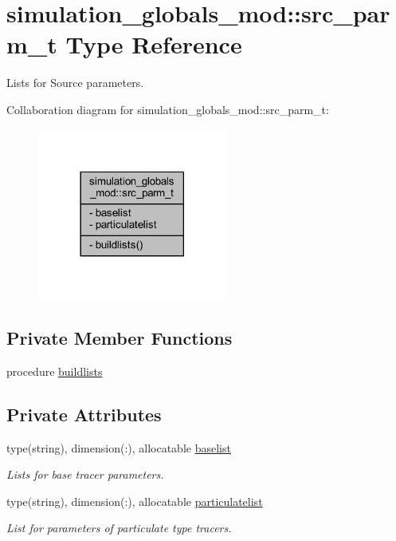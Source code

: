 \hypertarget{structsimulation__globals__mod_1_1src__parm__t}{}\section{simulation\+\_\+globals\+\_\+mod\+:\+:src\+\_\+parm\+\_\+t Type Reference}
\label{structsimulation__globals__mod_1_1src__parm__t}


Lists for Source parameters.  




Collaboration diagram for simulation\+\_\+globals\+\_\+mod\+:\+:src\+\_\+parm\+\_\+t\+:
\nopagebreak
\begin{figure}[H]
\begin{center}
\leavevmode
\includegraphics[width=177pt]{structsimulation__globals__mod_1_1src__parm__t__coll__graph}
\end{center}
\end{figure}
\subsection*{Private Member Functions}
\begin{DoxyCompactItemize}
\item 
procedure \mbox{\hyperlink{structsimulation__globals__mod_1_1src__parm__t_a02237bb7b77e69d8674b65de89e46793}{buildlists}}
\end{DoxyCompactItemize}
\subsection*{Private Attributes}
\begin{DoxyCompactItemize}
\item 
type(string), dimension(\+:), allocatable \mbox{\hyperlink{structsimulation__globals__mod_1_1src__parm__t_a613e2024516b63fd3b3a524ceffe4956}{baselist}}
\begin{DoxyCompactList}\small\item\em Lists for base tracer parameters. \end{DoxyCompactList}\item 
type(string), dimension(\+:), allocatable \mbox{\hyperlink{structsimulation__globals__mod_1_1src__parm__t_ab259c4c5cd79464ea8159a87334c982f}{particulatelist}}
\begin{DoxyCompactList}\small\item\em List for parameters of particulate type tracers. \end{DoxyCompactList}\end{DoxyCompactItemize}


